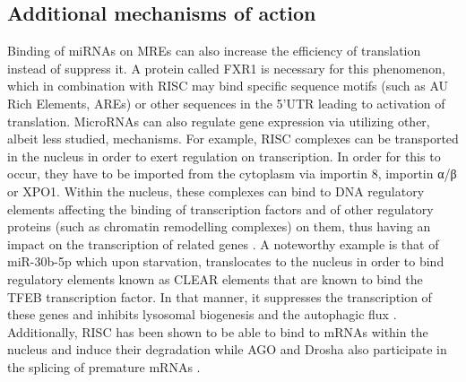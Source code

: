 \documentclass[en,ack]{dimscthesis}
\begin{document}
\newpage
\subsection{Additional mechanisms of action}
\par Binding of miRNAs on MREs can also increase the efficiency of translation instead of suppress it. A protein called FXR1 is necessary for this phenomenon, which in combination with RISC may bind specific sequence motifs (such as AU Rich Elements, AREs) or other sequences in the 5'UTR leading to activation of translation. MicroRNAs can also regulate gene expression via utilizing other, albeit less studied, mechanisms. For example, RISC complexes can be transported in the nucleus in order to exert regulation on transcription. In order for this to occur, they have to be imported from the cytoplasm via importin 8, importin α/β or XPO1. Within the nucleus, these complexes can bind to DNA regulatory elements affecting the binding of transcription factors and of other regulatory proteins (such as chromatin remodelling complexes) on them, thus having an impact on the transcription of related genes \parencite{kimMicroRNAdirectedTranscriptionalGene2008,chaluvally-raghavanDirectUpregulationSTAT32016,xiaoMicroRNAsActivateGene2017,guoNuclearMiR30b5pSuppresses2021}. A noteworthy example is that of miR-30b-5p which upon starvation, translocates to the nucleus in order to bind regulatory elements known as CLEAR elements that are known to bind the TFEB transcription factor. In that manner, it suppresses the transcription of these genes and inhibits lysosomal biogenesis and the autophagic flux \parencite{guoNuclearMiR30b5pSuppresses2021}. Additionally, RISC has been shown to be able to bind to mRNAs within the nucleus and induce their degradation while AGO and Drosha also participate in the splicing of premature mRNAs \parencite{obrienOverviewMicroRNABiogenesis2018}. 
\end{document}
